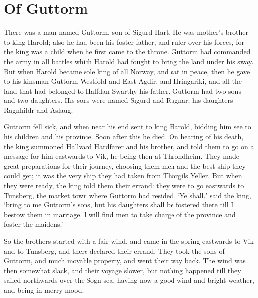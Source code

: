 \chapter{Of Guttorm}
There was a man named Guttorm, son of Sigurd Hart. He was mother's brother to king Harold; also he had been his foster-father, and ruler over his forces, for the king was a child when he first came to the throne. Guttorm had commanded the army in all battles which Harold had fought to bring the land under his sway. But when Harold became sole king of all Norway, and sat in peace, then he gave to his kinsman Guttorm Westfold and East-Agdir, and Hringariki, and all the land that had belonged to Halfdan Swarthy his father. Guttorm had two sons and two daughters. His sons were named Sigurd and Ragnar; his daughters Ragnhildr and Aslaug.

Guttorm fell sick, and when near his end sent to king Harold, bidding him see to his children and his province. Soon after this he died. On hearing of his death, the king summoned Hallvard Hardfarer and his brother, and told them to go on a message for him eastwards to Vik, he being then at Throndheim. They made great preparations for their journey, choosing them men and the best ship they could get; it was the very ship they had taken from Thorgils Yeller. But when they were ready, the king told them their errand: they were to go eastwards to Tunsberg, the market town where Guttorm had resided. `Ye shall,' said the king, `bring to me Guttorm's sons, but his daughters shall be fostered there till I bestow them in marriage. I will find men to take charge of the province and foster the maidens.'

So the brothers started with a fair wind, and came in the spring eastwards to Vik and to Tunsberg, and there declared their errand. They took the sons of Guttorm, and much movable property, and went their way back. The wind was then somewhat slack, and their voyage slower, but nothing happened till they sailed northwards over the Sogn-sea, having now a good wind and bright weather, and being in merry mood.
